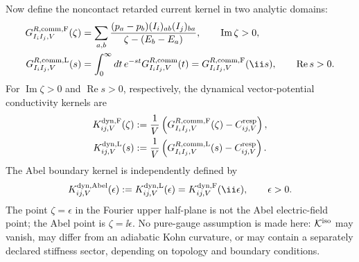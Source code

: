 \begin{proposition}
Now define the noncontact retarded current kernel in two analytic domains:
\begin{align}
  G^{R,\rm comm,F}_{I_iI_j,V}(\zeta)
  &=
  \sum_{a,b}
  \frac{(p_a-p_b)(I_i)_{ab}(I_j)_{ba}}
       {\zeta-(E_b-E_a)},
  \qquad \operatorname{Im}\zeta>0,
  \label{eq:kubo-finite-retarded-fourier-current}\\
  G^{R,\rm comm,L}_{I_iI_j,V}(s)
  &=
  \int_0^\infty dt\,e^{-st}
  G^{R,\rm comm}_{I_iI_j,V}(t)
  =
  G^{R,\rm comm,F}_{I_iI_j,V}(\ii s),
  \qquad \operatorname{Re}s>0 .
  \label{eq:kubo-finite-retarded-laplace-current}
\end{align}
For \(\operatorname{Im}\zeta>0\) and \(\operatorname{Re}s>0\), respectively,
the dynamical vector-potential conductivity kernels are
\begin{align}
  K^{\rm dyn,F}_{ij,V}(\zeta)
  &:=
  \frac1V\left(
    G^{R,\rm comm,F}_{I_iI_j,V}(\zeta)-C^{\rm resp}_{ij,V}
  \right),
  \label{eq:kubo-dynamical-vector-potential-fourier-kernel}\\
  K^{\rm dyn,L}_{ij,V}(s)
  &:=
  \frac1V\left(
    G^{R,\rm comm,L}_{I_iI_j,V}(s)-C^{\rm resp}_{ij,V}
  \right).
  \label{eq:kubo-dynamical-vector-potential-laplace-kernel}
\end{align}
The Abel boundary kernel is independently defined by
\begin{equation}
  K^{\rm dyn,Abel}_{ij,V}(\epsilon)
  :=
  K^{\rm dyn,L}_{ij,V}(\epsilon)
  =
  K^{\rm dyn,F}_{ij,V}(\ii\epsilon),
  \qquad \epsilon>0.
  \label{eq:kubo-dynamical-abel-kernel-definition}
\end{equation}
The point \(\zeta=\epsilon\) in the Fourier upper half-plane is not the Abel
electric-field point; the Abel point is \(\zeta=\ii\epsilon\).  No pure-gauge
assumption is made here: \(\mathcal K^{\rm iso}\) may vanish, may differ from
an adiabatic Kohn curvature, or may contain a separately declared stiffness
sector, depending on topology and boundary conditions.


\end{proposition}
